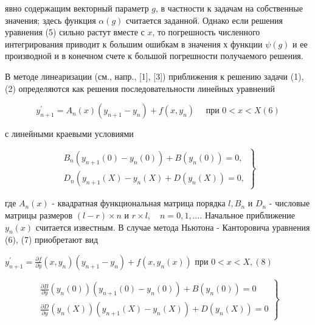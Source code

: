 \documentclass[10pt]{article}
\begin{document}
явно содержащим векторный параметр $g$, в частности к задачам на собственные значения; здесь функция $\alpha(g)$ считается заданной. Однако если решения уравнения (5) сильно растут вместе с $x$, то погрешность численного интегрирования приводит к большим ошибкам в значения х функции $\psi(g)$ и ее производной и в конечном счете к большой погрешности получаемого решения.



В методе линеаризации (см., напр., [1], [3]) приближения к решению задачи (1), (2) определяются как решения последовательности линейных уравнений



\[

y_{n+1}^{\prime}=A_{n}(x)\left(y_{n+1}-y_{n}\right)+f\left(x, y_{n}\right) \quad \text { при } 0<x<X(6)

\]



с линейными краевыми условиями



\[

\left.\begin{array}{l}

B_{n}\left(y_{n+1}(0)-y_{n}(0)\right)+B\left(y_{n}(0)\right)=0, \\

D_{n}\left(y_{n+1}(X)-y_{n}(X)+D\left(y_{n}(X)\right)=0,\right.

\end{array}\right\}

\]



где $A_{n}(x)$ - квадратная функциональная матрица порядка $l, B_{n}$ и $D_{n}$ - числовые матрицы размеров $(l-r) \times n$ и $r \times l, \quad n=0,1, \ldots$. Начальное приближение $y_{n}(x)$ считается известным. В случае метода Ньютона - Канторовича уравнения (6), (7) приобретают вид



$y_{n+1}^{\prime}=\frac{\partial f}{\partial y}\left(x, y_{n}\right)\left(y_{n+1}-y_{n}\right)+f\left(x, y_{n}(x)\right)$ при $0<x<X,(8)$



\[

\left.\begin{array}{l}

\frac{\partial B}{\partial y}\left(y_{n}(0)\right)\left(y_{n+1}(0)-y_{n}(0)\right)+B\left(y_{n}(0)\right)=0 \\

\frac{\partial D}{\partial y}\left(y_{n}(X)\right)\left(y_{n+1}(X)-y_{n}(X)\right)+D\left(y_{n}(X)\right)=0

\end{array}\right\}

\]
\end{document}
